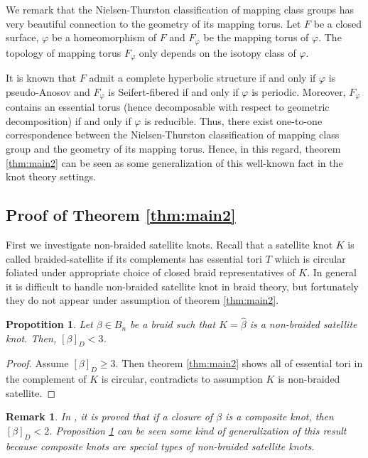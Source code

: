 \documentclass[12pt]{amsart}
\newtheorem{prop}{Propotition}
\newtheorem{rem}{Remark}}
\begin{document}
   We remark that the Nielsen-Thurston classification of mapping class groups has very beautiful connection to the geometry of its mapping torus. Let $F$ be a closed surface, $\varphi$ be a homeomorphism of $F$ and $F_{\varphi}$ be the mapping torus of $\varphi$. The topology of mapping torus $F_{\varphi}$ only depends on the isotopy class of $\varphi$.
   
   It is known that $F$ admit a complete hyperbolic structure if and only if $\varphi$ is pseudo-Anosov and $F_{\varphi}$ is Seifert-fibered if and only if $\varphi$ is periodic. Moreover, $F_{\varphi}$ contains an essential torus (hence decomposable with respect to geometric decomposition) if and only if $\varphi$ is reducible. Thus, there exist one-to-one correspondence between the Nielsen-Thurston classification of mapping class group and the geometry of its mapping torus.
 Hence, in this regard, theorem \ref{thm:main2} can be seen as some generalization of this well-known fact in the knot theory settings. 

\subsection{Proof of Theorem \ref{thm:main2}}

   First we investigate non-braided satellite knots. Recall that a satellite knot $K$ is called braided-satellite if its complements has essential tori $T$ which is circular foliated under appropriate choice of closed braid representatives of $K$.
In general it is difficult to handle non-braided satellite knot in braid theory, but fortunately they do not appear under assumption of theorem \ref{thm:main2}.

\begin{prop}
\label{prop:nbdsatellite}
Let $\beta \in B_{n}$ be a braid such that $K=\widehat{\beta}$ is a non-braided satellite knot. Then, $[\beta ]_{D} < 3 $. 
\end{prop} 
    
\begin{proof}
   Assume $[\beta]_{D} \geq 3$. Then theorem \ref{thm:main2} shows all of essential tori in the complement of $K$ is circular, contradicts to assumption $K$ is non-braided satellite.
\end{proof}

\begin{rem}
In \cite{mn}, it is proved that if a closure of $\beta$ is a composite knot, then $[\beta]_{D}<2$. Proposition \ref{prop:nbdsatellite} can be seen some kind of generalization of this result because composite knots are special types of non-braided satellite knots.
\end{rem}
\end{document}
